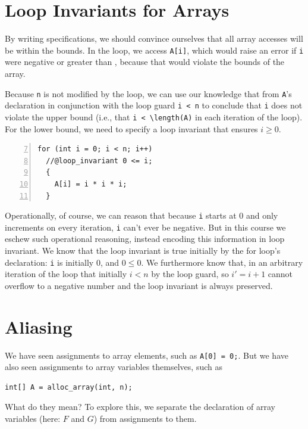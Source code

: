 \section{Loop Invariants for Arrays}
\label{sec:arrays:invariants}

By writing specifications, we should convince ourselves that all array
accesses will be within the bounds.  In the loop, we access
\lstinline'A[i]', which would raise an error if \lstinline'i' were
negative or greater than , because that would violate the
bounds of the array.

Because \lstinline'n' is not modified by the loop, we can use our
knowledge that  from \lstinline'A''s declaration in
conjunction with the loop guard \lstinline'i < n' to conclude that
\lstinline'i' does not violate the upper bound (i.e., that
\lstinline'i < \length(A)' in each iteration of the loop). For the
lower bound, we need to specify a loop invariant that ensures $i \geq
0$.
\begin{lstlisting}[language={[C0]C}, numbers=left,firstnumber=7]
  for (int i = 0; i < n; i++)
  //@loop_invariant 0 <= i;
  {
    A[i] = i * i * i;
  }
\end{lstlisting}
Operationally, of course, we can reason that because \lstinline'i'
starts at 0 and only increments on every iteration, \lstinline'i'
can't ever be negative.  But in this course we eschew such operational
reasoning, instead encoding this information in loop invariant. We
know that the loop invariant is true initially by the for loop's
declaration: \lstinline'i' is initially 0, and $0 \leq 0$. We
furthermore know that, in an arbitrary iteration of the loop that
initially $i < n$ by the loop guard, so $i' = i+1$ cannot overflow to
a negative number and the loop invariant is always preserved.


\section{Aliasing}
\label{sec:arrays:aliasing}

We have seen assignments to array elements, such as %
\lstinline'A[0] = 0;'.  But we have also seen assignments to array
variables themselves, such as

\begin{lstlisting}[language={[C0]C}]
int[] A = alloc_array(int, n);
\end{lstlisting}

What do they mean?  To explore this, we separate the declaration of
array variables (here: $F$ and $G$) from assignments to them.

